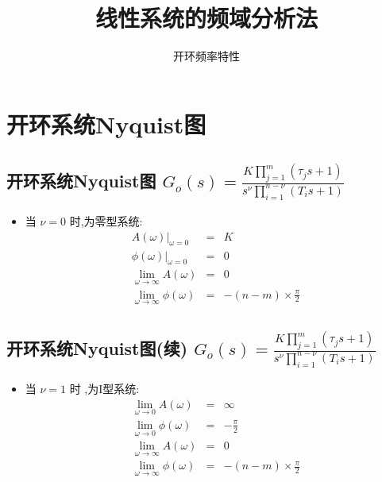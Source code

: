 \documentclass[table]{article}
\subtitle{开环频率特性}
\date{}
\title{线性系统的频域分析法}
\begin{document}
\maketitle
\tableofcontents











\section{开环系统Nyquist图}
\label{sec:org0a41274}
\subsection{开环系统Nyquist图 \(G_o(s) =\frac{K\prod_{j=1}^m(\tau_j s+1)}{s^{\nu}\prod_{i=1}^{n-\nu}(T_i s+1)}\)}
\label{sec:orgf185312}
\begin{itemize}
\item 当  \(\nu=0\)  时,为零型系统:
\begin{eqnarray*}
\left. A(\omega)\right|_{\omega=0} & = & K\\
\left. \phi(\omega)\right|_{\omega=0}&=&0 \\
\lim_{\omega\rightarrow\infty} A(\omega)&=&0 \\
\lim_{\omega\rightarrow\infty} \phi(\omega)&=& -(n-m)\times\frac{\pi}{2} 
\end{eqnarray*}
\end{itemize}
\subsection{开环系统Nyquist图(续) \(G_o(s) =\frac{K\prod_{j=1}^m(\tau_j s+1)}{s^{\nu}\prod_{i=1}^{n-\nu}(T_i s+1)}\)}
\label{sec:org7f0a155}
\begin{itemize}
\item 当  \(\nu=1\)  时 ,为I型系统:
\begin{eqnarray*}
\lim_{\omega\rightarrow 0} A(\omega) & = & \infty\\
\lim_{\omega\rightarrow 0} \phi(\omega)&=&-\frac{\pi}{2} \\
\lim_{\omega\rightarrow\infty} A(\omega)&=&0 \\
\lim_{\omega\rightarrow\infty} \phi(\omega)&=& -(n-m)\times\frac{\pi}{2} 
\end{eqnarray*}
\end{itemize}
\end{document}
